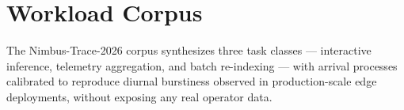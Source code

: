 \section{Workload Corpus}

The Nimbus-Trace-2026 corpus synthesizes three task classes --- interactive
inference, telemetry aggregation, and batch re-indexing --- with arrival
processes calibrated to reproduce diurnal burstiness observed in
production-scale edge deployments, without exposing any real operator data.
